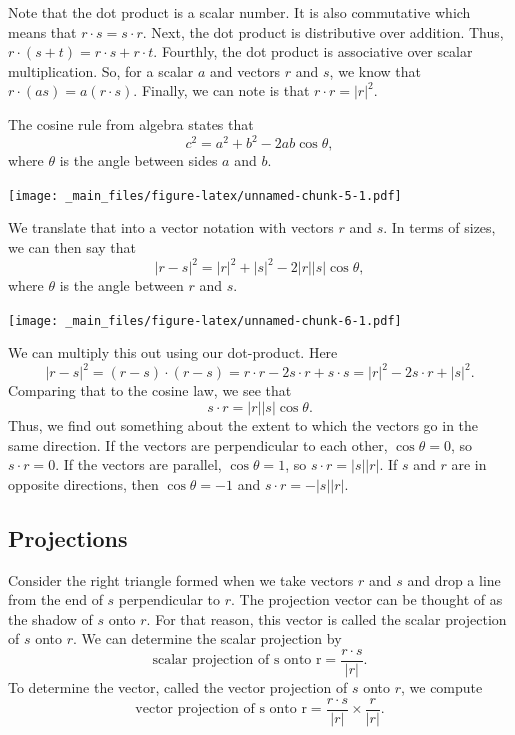 \documentclass[
]{book}
\theoremstyle{definition}
\theoremstyle{definition}
\theoremstyle{definition}
\theoremstyle{definition}
\theoremstyle{remark}
\begin{document}
Note that the dot product is a scalar number. It is also commutative which means that \(r \cdot s = s \cdot r\). Next, the dot product is distributive over addition. Thus, \(r \cdot (s + t) = r \cdot s + r \cdot t\). Fourthly, the dot product is associative over scalar multiplication. So, for a scalar \(a\) and vectors \(r\) and \(s\), we know that \(r \cdot(as) = a(r \cdot s)\). Finally, we can note is that \(r \cdot r = |r|^2\).

The cosine rule from algebra states that \[c^2 = a^2 + b^2 - 2ab\cos \theta,\] where \(\theta\) is the angle between sides \(a\) and \(b\).

\texttt{[image: \_main\_files/figure-latex/unnamed-chunk-5-1.pdf]}

We translate that into a vector notation with vectors \(r\) and \(s\). In terms of sizes, we can then say that \[|r-s|^2 = |r|^2 + |s|^2 - 2|r||s|\cos \theta,\] where \(\theta\) is the angle between \(r\) and \(s\).

\texttt{[image: \_main\_files/figure-latex/unnamed-chunk-6-1.pdf]}

We can multiply this out using our dot-product. Here \[|r - s|^2 = (r-s) \cdot (r-s) = r \cdot r - 2s \cdot r + s \cdot s = |r|^2 - 2 s \cdot r + |s|^2.\] Comparing that to the cosine law, we see that \[s \cdot r = |r||s| \cos \theta.\] Thus, we find out something about the extent to which the vectors go in the same direction. If the vectors are perpendicular to each other, \(\cos \theta = 0\), so \(s \cdot r = 0\). If the vectors are parallel, \(\cos \theta = 1\), so \(s \cdot r = |s||r|\). If \(s\) and \(r\) are in opposite directions, then \(\cos \theta = -1\) and \(s \cdot r = -|s||r|\).

\hypertarget{projections}{%
\subsection{Projections}\label{projections}}

Consider the right triangle formed when we take vectors \(r\) and \(s\) and drop a line from the end of \(s\) perpendicular to \(r\). The projection vector can be thought of as the shadow of \(s\) onto \(r\). For that reason, this vector is called the scalar projection of \(s\) onto \(r\). We can determine the scalar projection by \[\text{scalar projection of s onto r} = \dfrac{r \cdot s}{|r|}.\] To determine the vector, called the vector projection of \(s\) onto \(r\), we compute \[\text{vector projection of s onto r} = \dfrac{r \cdot s}{|r|} \times \dfrac{r}{|r|}.\]
\end{document}
